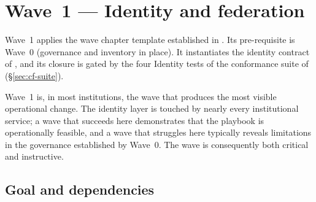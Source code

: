 
\chapter{Wave~1 --- Identity and federation}
\label{ch:wave1-identity}

\begin{caveatbox}[Dependencies]
\noindent Wave~1 applies the wave chapter template established in
. Its pre-requisite is Wave~0
(governance and inventory in place). It instantiates the identity
contract of , and its closure is gated by
the four Identity tests of the conformance suite of
 (\S\ref{sec:cf-suite}).
\end{caveatbox}

Wave~1 is, in most institutions, the wave that produces the most
visible operational change. The identity layer is touched by
nearly every institutional service; a wave that succeeds here
demonstrates that the playbook is operationally feasible, and a
wave that struggles here typically reveals limitations in the
governance established by Wave~0. The wave is consequently both
critical and instructive.

\section{Goal and dependencies}
\label{sec:w1-goal}


